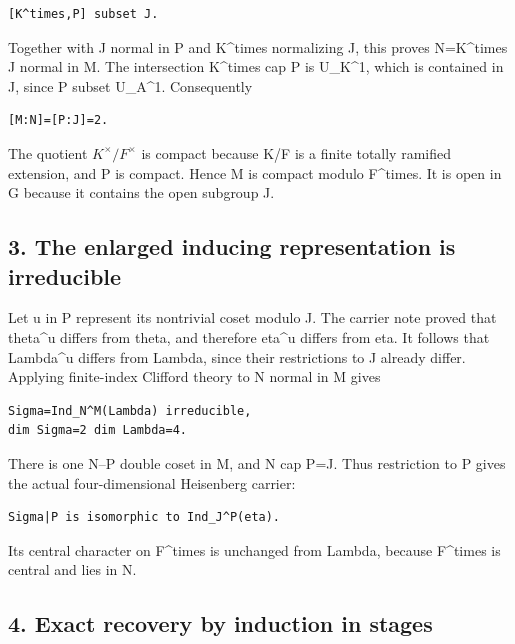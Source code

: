 \begin{Verbatim}[fontsize=\small,breaklines=true,breakanywhere=true]
[K^times,P] subset J.
\end{Verbatim}

Together with J normal in P and K\^{}times normalizing J, this proves
N=K\^{}times J normal in M. The intersection K\^{}times cap P is
U\_K\^{}1, which is contained in J, since P subset U\_A\^{}1.
Consequently

\begin{Verbatim}[fontsize=\small,breaklines=true,breakanywhere=true]
[M:N]=[P:J]=2.
\end{Verbatim}

The quotient \(K^\times/F^\times\) is compact because K/F is a
finite totally ramified extension, and P is compact. Hence M is compact
modulo F\^{}times. It is open in G because it contains the open subgroup
J.

\hypertarget{rank4_stages-the-enlarged-inducing-representation-is-irreducible}{%
\subsection{3. The enlarged inducing representation is
irreducible}\label{rank4_stages-the-enlarged-inducing-representation-is-irreducible}}

Let u in P represent its nontrivial coset modulo J. The carrier note
proved that theta\^{}u differs from theta, and therefore eta\^{}u
differs from eta. It follows that Lambda\^{}u differs from Lambda, since
their restrictions to J already differ. Applying finite-index Clifford
theory to N normal in M gives

\begin{Verbatim}[fontsize=\small,breaklines=true,breakanywhere=true]
Sigma=Ind_N^M(Lambda) irreducible,
dim Sigma=2 dim Lambda=4.
\end{Verbatim}

There is one N--P double coset in M, and N cap P=J. Thus restriction to
P gives the actual four-dimensional Heisenberg carrier:

\begin{Verbatim}[fontsize=\small,breaklines=true,breakanywhere=true]
Sigma|P is isomorphic to Ind_J^P(eta).
\end{Verbatim}

Its central character on F\^{}times is unchanged from Lambda, because
F\^{}times is central and lies in N.

\hypertarget{rank4_stages-exact-recovery-by-induction-in-stages}{%
\subsection{4. Exact recovery by induction in
stages}\label{rank4_stages-exact-recovery-by-induction-in-stages}}

